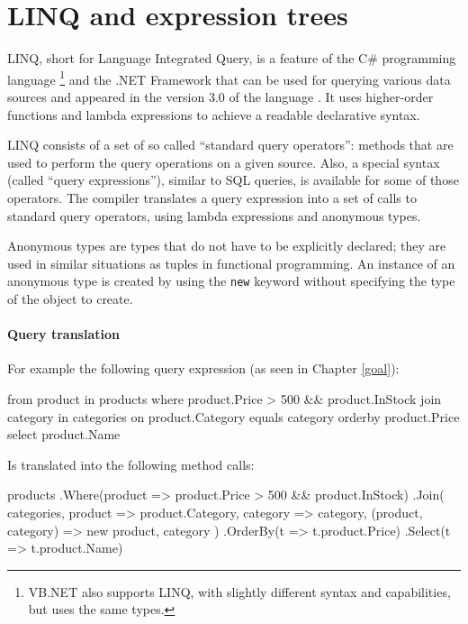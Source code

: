\section{LINQ and expression trees}

\acs{LINQ}, short for Language Integrated Query, is a feature of the C\# programming language%
\footnote{\ac{VB.NET} also supports \ac{LINQ}, with slightly different syntax
and capabilities, but uses the same types.}
and the .NET Framework that can be used for querying various data sources
and appeared in the version 3.0 of the language \cite{cs-in-depth}.
It uses higher-order functions and lambda expressions to achieve a readable declarative syntax.

\ac{LINQ} consists of a set of so called “standard query operators”:
methods that are used to perform the query operations on a given source.
Also, a special syntax (called “query expressions”), similar to \ac{SQL} queries, is available
for some of those operators.
The compiler translates a query expression into a set of calls to standard query operators,
using lambda expressions and anonymous types.

Anonymous types are types that do not have to be explicitly declared;
they are used in similar situations as tuples in functional programming.
An instance of an anonymous type is created by using the \lstinline{new} keyword
without specifying the type of the object to create.

\paragraph{Query translation}

For example the following query expression (as seen in Chapter \ref{goal}):

\nopagebreak

\begin{code}
from product in products
where product.Price > 500
   && product.InStock
join category in categories on product.Category equals category
orderby product.Price
select product.Name
\end{code}

Is translated into the following method calls:

\begin{code}
products
    .Where(product => product.Price > 500 && product.InStock)
    .Join(
        categories,
        product => product.Category,
        category => category,
        (product, category) => new { product, category })
    .OrderBy(t => t.product.Price)
    .Select(t => t.product.Name)
\end{code}

